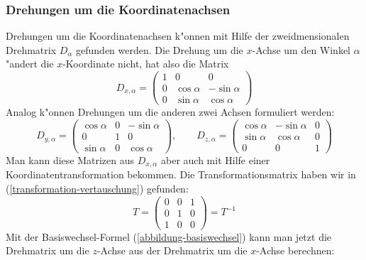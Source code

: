 \subsubsection{Drehungen um die Koordinatenachsen}
Drehungen um die Koordinatenachsen k"onnen mit Hilfe der zweidmensionalen
Drehmatrix $D_\alpha$ gefunden werden. Die Drehung um die $x$-Achse um den
Winkel $\alpha$ "andert die $x$-Koordinate nicht, hat also die
Matrix
\[
D_{x,\alpha}=
\begin{pmatrix}
1&0&0\\
0&\cos\alpha&-\sin\alpha\\
0&\sin\alpha&\cos\alpha
\end{pmatrix}
\]
Analog k"onnen Drehungen um die anderen zwei Achsen formuliert werden:
\[
D_{y,\alpha}=\begin{pmatrix}
\cos\alpha&0&-\sin\alpha\\
0&1&0\\
\sin\alpha&0&\cos\alpha
\end{pmatrix}
,\qquad
D_{z,\alpha}=\begin{pmatrix}
\cos\alpha&-\sin\alpha&0\\
\sin\alpha&\cos\alpha&0\\
0&0&1
\end{pmatrix}
\]
Man kann diese Matrizen aus $D_{x,\alpha}$ aber auch mit Hilfe einer
Koordinatentransformation bekommen. Die Transformationsmatrix
haben wir in (\ref{transformation-vertauschung}) gefunden:
\[
T=
\begin{pmatrix}
0&0&1\\
0&1&0\\
1&0&0
\end{pmatrix}
=T^{-1}
\]
Mit der Basiswechsel-Formel (\ref{abbildung-basiswechsel}) kann
man jetzt die Drehmatrix um die $z$-Achse aus der Drehmatrix um die
$x$-Achse berechnen:
